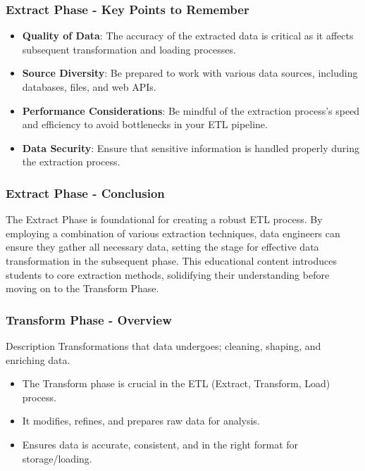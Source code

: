 \documentclass[aspectratio=169]{beamer}
\begin{document}
\begin{frame}[fragile]
    \frametitle{Extract Phase - Key Points to Remember}
    \begin{itemize}
        \item \textbf{Quality of Data}: The accuracy of the extracted data is critical as it affects subsequent transformation and loading processes.
        \item \textbf{Source Diversity}: Be prepared to work with various data sources, including databases, files, and web APIs.
        \item \textbf{Performance Considerations}: Be mindful of the extraction process's speed and efficiency to avoid bottlenecks in your ETL pipeline.
        \item \textbf{Data Security}: Ensure that sensitive information is handled properly during the extraction process.
    \end{itemize}
\end{frame}

\begin{frame}[fragile]
    \frametitle{Extract Phase - Conclusion}
    The Extract Phase is foundational for creating a robust ETL process. By employing a combination of various extraction techniques, data engineers can ensure they gather all necessary data, setting the stage for effective data transformation in the subsequent phase. 
    This educational content introduces students to core extraction methods, solidifying their understanding before moving on to the Transform Phase.
\end{frame}

\begin{frame}[fragile]
    \frametitle{Transform Phase - Overview}
    \begin{block}{Description}
        Transformations that data undergoes; cleaning, shaping, and enriching data.
    \end{block}
    
    \begin{itemize}
        \item The Transform phase is crucial in the ETL (Extract, Transform, Load) process.
        \item It modifies, refines, and prepares raw data for analysis.
        \item Ensures data is accurate, consistent, and in the right format for storage/loading.
    \end{itemize}
\end{frame}
\end{document}
